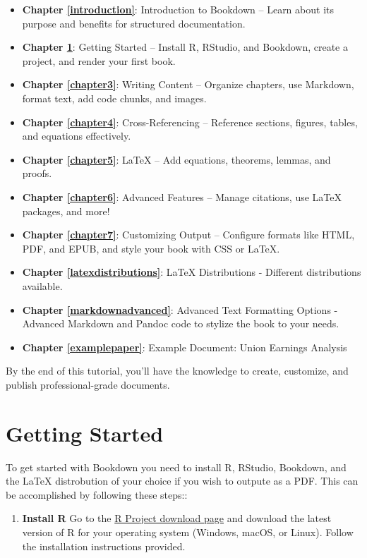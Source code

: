 \documentclass[
]{book}
\providecommand{\tightlist}{%
  \setlength{\itemsep}{0pt}\setlength{\parskip}{0pt}}
\theoremstyle{definition}
\theoremstyle{definition}
\theoremstyle{definition}
\theoremstyle{definition}
\theoremstyle{remark}
\begin{document}
\begin{itemize}
\tightlist
\item
  \textbf{Chapter \ref{introduction}}: Introduction to Bookdown -- Learn about its purpose and benefits for structured documentation.
\item
  \textbf{Chapter \ref{chapter2}}: Getting Started -- Install R, RStudio, and Bookdown, create a project, and render your first book.
\item
  \textbf{Chapter \ref{chapter3}}: Writing Content -- Organize chapters, use Markdown, format text, add code chunks, and images.
\item
  \textbf{Chapter \ref{chapter4}}: Cross-Referencing -- Reference sections, figures, tables, and equations effectively.
\item
  \textbf{Chapter \ref{chapter5}}: LaTeX -- Add equations, theorems, lemmas, and proofs.
\item
  \textbf{Chapter \ref{chapter6}}: Advanced Features -- Manage citations, use LaTeX packages, and more!
\item
  \textbf{Chapter \ref{chapter7}}: Customizing Output -- Configure formats like HTML, PDF, and EPUB, and style your book with CSS or LaTeX.
\item
  \textbf{Chapter \ref{latexdistributions}}: LaTeX Distributions - Different distributions available.
\item
  \textbf{Chapter \ref{markdownadvanced}}: Advanced Text Formatting Options - Advanced Markdown and Pandoc code to stylize the book to your needs.
\item
  \textbf{Chapter \ref{examplepaper}}: Example Document: Union Earnings Analysis
\end{itemize}

By the end of this tutorial, you'll have the knowledge to create, customize, and publish professional-grade documents.

\chapter{Getting Started}\label{chapter2}

To get started with Bookdown you need to install R, RStudio, Bookdown, and the LaTeX distrobution of your choice if you wish to outpute as a PDF. This can be accomplished by following these steps::

\begin{enumerate}
\def\labelenumi{\arabic{enumi}.}
\tightlist
\item
  \textbf{Install R}
  Go to the \href{https://cran.r-project.org/}{R Project download page} and download the latest version of R for your operating system (Windows, macOS, or Linux). Follow the installation instructions provided.
\end{enumerate}
\end{document}
